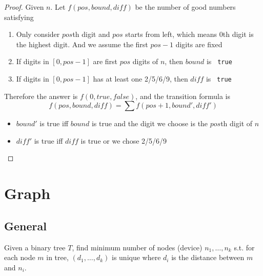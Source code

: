 \documentclass[11pt]{article}
\let\OldTexttt\texttt
\renewcommand{\texttt}[1]{\OldTexttt{\color{MidnightBlue} #1}}
\begin{document}
\begin{proof}
Given \(n\).
Let \(f(pos,bound,diff)\) be the number of good numbers satisfying
\begin{enumerate}
\item Only consider \(pos\)th digit and \(pos\) starts from left, which means 0th digit is the
highest digit. And we assume the first \(pos-1\)
digits are fixed
\item If digits in \([0,pos-1]\) are first \(pos\) digits of \(n\), then \(bound\) is \texttt{true}
\item If digits in \([0,pos-1]\) has at least one 2/5/6/9, then \(diff\) is \texttt{true}
\end{enumerate}

Therefore the answer is \(f(0, true, false)\), and the transition formula is
\begin{equation*}
f(pos,bound,diff)=\sum f(pos+1,bound',diff')
\end{equation*}
\begin{itemize}
\item \(bound'\) is true iff \(bound\) is true and the digit we choose is the \(pos\)th digit
of \(n\)
\item \(diff'\) is true iff \(diff\) is true or we chose 2/5/6/9
\end{itemize}
\end{proof}
\section{Graph}
\label{sec:org81040f5}
\subsection{General}
\label{sec:org7815ab4}
\begin{problem}
Given a binary tree \(T\), find minimum number of nodes (device) \(n_1,\dots,n_k\) s.t. for each node \(m\) in
tree, \((d_1,\dots,d_k)\) is unique where \(d_i\) is the distance between \(m\) and \(n_i\).
\end{problem}
\end{document}
